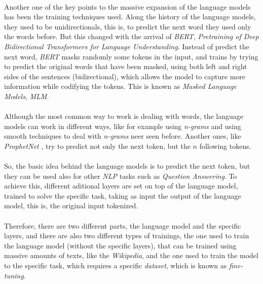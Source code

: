 \paragraph{}
Another one of the key points to the massive expansion of the language models has been the training techniques used. Along the history of the language models, they used to be unidirectionals, this is, to predict the next word they used only the words before. But this changed with the arrival of \emph{BERT}, \emph{Pre\-training of Deep Bidirectional Transformers for Language Understanding}. \cite{Devlin2018} Instead of predict the next word, \emph{BERT} masks randomly some tokens in the input, and trains by trying to predict the original words that have been masked, using both left and right sides of the sentences (bidirectional), which allows the model to capture more information while codifying the tokens. This is known as \emph{Masked Language Models}, \emph{MLM}.
\paragraph{}
Although the most common way to work is dealing with words, the language models can work in different ways, like for example using \emph{n-grams} and using smooth techniques to deal with \emph{n-grams} neer seen before\cite{Knesser1995}. Another ones, like \emph{ProphetNet} \cite{Yan2020}, try to predict not only the next token, but the $n$ following tokens.
\paragraph{}
So, the basic idea behind the language models is to predict the next token, but they can be used also for other \emph{NLP} tasks such as \emph{Question Answering}. To achieve this, different aditional layers are set on top of the language model, trained to solve the specific task, taking as input the output of the language model, this is, the original input tokenized. 
\paragraph{}
Therefore, there are two different parts, the language model and the specific layers, and there are also two different types of trainings, the one used to train the language model (without the specific layers), that can be trained using massive amounts of texts, like the \emph{Wikipedia}, and the one used to train the model to the specific task, which requires a specific \emph{dataset}, which is known as \emph{fine-tuning}.
